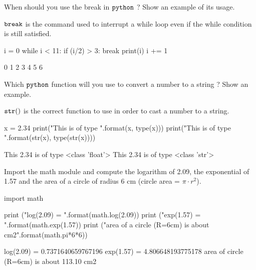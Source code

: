 \begin{question}
When should you use the break in \(\tt{python}\) ? Show an example of its usage.
\end{question}

\cprotEnv \begin{solution}
\(\tt{break}\) is the command used to interrupt a while loop even if the while condition is still satisfied.

\begin{ipython}
i = 0
while i < 11:
    if (i/2) > 3:
        break
    print(i)
    i += 1 
\end{ipython}
\begin{ioutput}    
0
1
2
3
4
5
6
\end{ioutput}
\end{solution}

\begin{question}
Which \(\tt{python}\) function will you use to convert a number to a string ? Show an example.
\end{question}

\cprotEnv \begin{solution}
\(\tt{str()}\) is the correct function to use in order to cast a number to a string.

\begin{ipython}
x = 2.34
print("This {} is of type {}".format(x, type(x)))
print("This {} is of type {}".format(str(x), type(str(x))))
\end{ipython}
\begin{ioutput}    
This 2.34 is of type <class 'float'>
This 2.34 is of type <class 'str'>
\end{ioutput}
\end{solution}

\begin{question}
Import the math module and compute the logarithm of 2.09, the exponential of 1.57 and the area of a circle of radius 6 cm (circle area = $\pi \cdot r^2$).
\end{question}

\cprotEnv \begin{solution}
\begin{ipython}
import math

print ("log(2.09) = {}".format(math.log(2.09))
print ("exp(1.57) = {}".format(math.exp(1.57))
print ("area of a circle (R=6cm) is about {} cm2".format(math.pi*6*6))
\end{ipython}
\begin{ioutput}    
log(2.09) = 0.7371640659767196
exp(1.57) = 4.806648193775178
area of circle (R=6cm) is about 113.10 cm2
\end{ioutput}
\end{solution}

